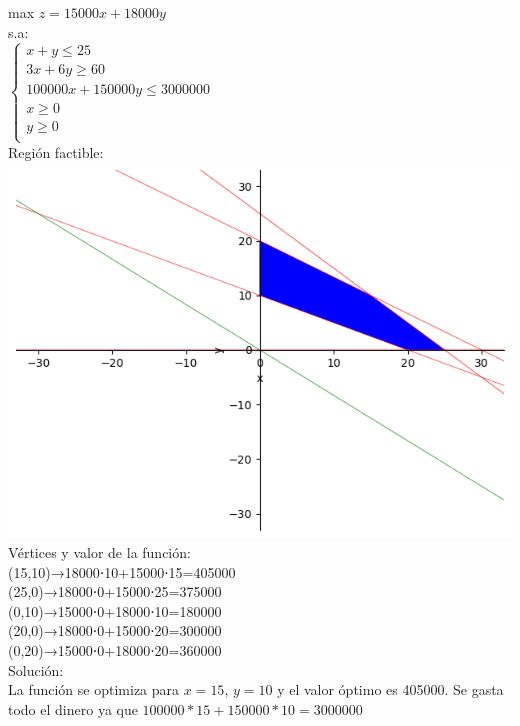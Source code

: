 \documentclass[addpoints,spanish, 12pt,a4paper]{exam}
\begin{document}
\begin{questions}
\begin{solution}
    max $z=15000 x + 18000 y$ \\
    s.a: \\
    $\left\{ \begin{matrix}x+y \leq 25  \\ 3x+6y \geq 60 \\ 100000x+150000y \leq 3000000 \\ x \geq 0 \\ y \geq 0 \\ \end{matrix}\right.$ \\
    Región factible: \\
    \includegraphics[scale=0.30]{pl2022.png} \\
    Vértices y valor de la función: \\

    (15,10)→18000⋅10+15000⋅15=405000 \\
    (25,0)→18000⋅0+15000⋅25=375000 \\
    (0,10)→15000⋅0+18000⋅10=180000 \\
    (20,0)→18000⋅0+15000⋅20=300000 \\
    (0,20)→15000⋅0+18000⋅20=360000 \\
    
    Solución: \\
    La función se optimiza para $x=15$, $y=10$ y el valor óptimo es 405000. Se gasta todo el dinero ya que $100000*15+150000*10 = 3000000$


\end{solution}
\end{questions}
\end{document}
